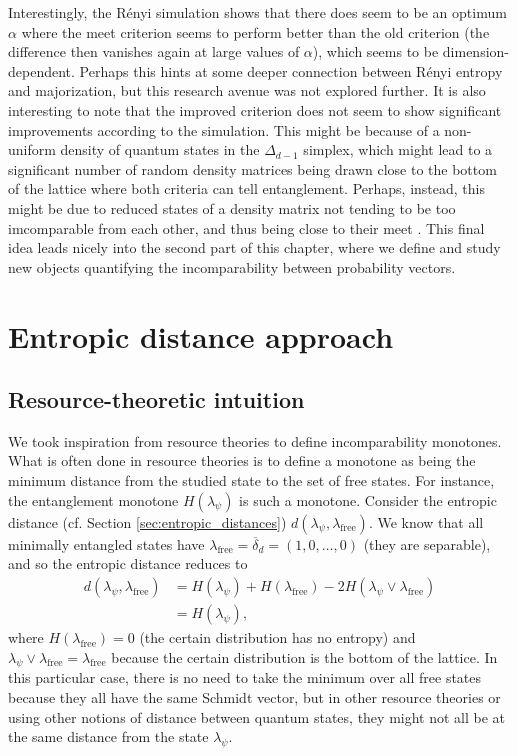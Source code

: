 Interestingly, the Rényi simulation shows that there does seem to be an optimum $\alpha$ where the meet criterion seems to perform better than the old criterion (the difference then vanishes again at large values of $\alpha$), which seems to be dimension-dependent. Perhaps this hints at some deeper connection between Rényi entropy and majorization, but this research avenue was not explored further. It is also interesting to note that the improved criterion does not seem to show significant improvements according to the simulation. This might be because of a non-uniform density of quantum states in the $\Delta_{d-1}$ simplex, which might lead to a significant number of random density matrices being drawn close to the bottom of the lattice where both criteria can tell entanglement. Perhaps, instead, this might be due to reduced states of a density matrix not tending to be too imcomparable from each other, and thus being close to their meet%
. This final idea leads nicely into the second part of this chapter, where we define and study new objects quantifying the incomparability between probability vectors.



\section{Entropic distance approach}

\subsection{Resource-theoretic intuition}

We took inspiration from resource theories to define incomparability monotones. What is often done in resource theories is to define a monotone as being the minimum distance from the studied state to the set of free states. For instance, the entanglement monotone $H(\lambda_\psi)$ is such a monotone. Consider the entropic distance (cf. Section \ref{sec:entropic_distances}) $d(\lambda_\psi, \lambda_{\text{free}})$. We know that all minimally entangled states have $\lambda_\text{free} = \overline{\delta}_d = (1, 0, \dots, 0)$ (they are separable), and so the entropic distance reduces to
\begin{align}
    d(\lambda_\psi, \lambda_\text{free}) &= H(\lambda_\psi) + H(\lambda_\text{free}) - 2 H(\lambda_\psi \vee \lambda_\text{free})\\
                                      &= H(\lambda_\psi),
\end{align}
\noindent where $H(\lambda_\text{free}) = 0$ (the certain distribution has no entropy) and $\lambda_\psi \vee \lambda_\text{free} = \lambda_\text{free}$ because the certain distribution is the bottom of the lattice. In this particular case, there is no need to take the minimum over all free states because they all have the same Schmidt vector, but in other resource theories or using other notions of distance between quantum states, they might not all be at the same distance from the state $\lambda_\psi$.

